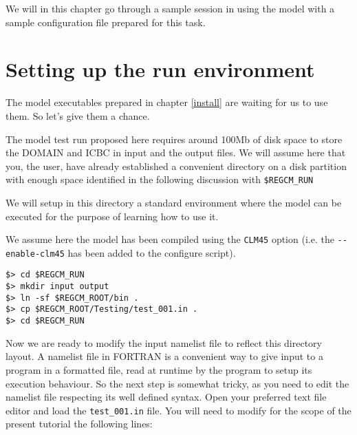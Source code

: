 
We will in this chapter go through a sample session in using the model with
a sample configuration file prepared for this task.

\section{Setting up the run environment}

The model executables prepared in chapter \ref{install} are waiting for us to
use them. So let's give them a chance.

The model test run proposed here requires around 100Mb of disk space to store
the DOMAIN and ICBC in input and the output files. We will assume here that you,
the user, have already established a convenient directory on a disk partition
with enough space identified in the following discussion with \verb=$REGCM_RUN=

We will setup in this directory a standard environment where the model can be
executed for the purpose of learning how to use it.

We assume here the model has been compiled using the \verb=CLM45= option (i.e.
the \verb=--enable-clm45= has been added to the configure script).

\begin{Verbatim}
$> cd $REGCM_RUN
$> mkdir input output
$> ln -sf $REGCM_ROOT/bin .
$> cp $REGCM_ROOT/Testing/test_001.in .
$> cd $REGCM_RUN
\end{Verbatim}

Now we are ready to modify the input namelist file to reflect this directory
layout. A namelist file in FORTRAN is a convenient way to give input to a
program in a formatted file, read at runtime by the program to setup its
execution behaviour. So the next step is somewhat tricky, as you need to edit
the namelist file respecting its well defined syntax. Open your preferred text
file editor and load the \verb=test_001.in= file. You will need to modify for
the scope of the present tutorial the following lines:

